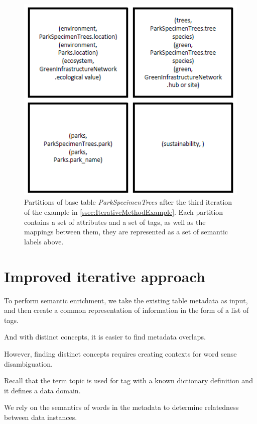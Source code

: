\begin{figure}
    \centering
    \includegraphics[width=5in]{figures/partitions-park-specimen-trees.png}
    \caption{Partitions of base table \textit{ParkSpecimenTrees} after the third iteration of the example in \autoref{ssec:IterativeMethodExample}. Each partition contains a set of attributes and a set of tags, as well as the mappings between them, they are represented as a set of semantic labels above.}
    \label{fig:partitions-park-specimen-trees}
\end{figure}

\section{Improved iterative approach}
\label{sec:ImprovedIterativeApproach}

To perform semantic enrichment, we take the existing table metadata as input, and then create a common representation of information in the form of a list of tags.

And with distinct concepts, it is easier to find metadata overlaps.

However, finding distinct concepts requires creating contexts for word sense disambiguation.

Recall that the term topic is used for tag with a known dictionary definition and it defines a data domain.

We rely on the semantics of words in the metadata to determine relatedness between data instances.


